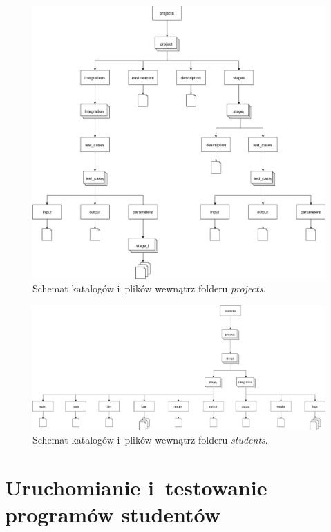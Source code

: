\begin{figure}[H]
    \centering
    \includegraphics[width = 13cm]{chapter05/projects_dirs.png}
    \caption{Schemat katalogów i~plików wewnątrz folderu \textit{projects}.}
    \label{fig:projects-directories}
\end{figure}


\begin{figure}[H]
    \centering
    \includegraphics[width = 13cm]{chapter05/students_dirs.png}
    \caption{Schemat katalogów i~plików wewnątrz folderu \textit{students}.}
    \label{fig:students-directories}
\end{figure}

\section{Uruchomianie i~testowanie programów studentów}
\label{run-and-test}

